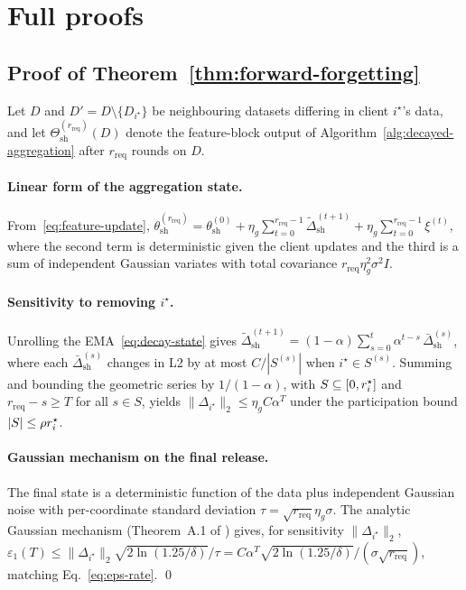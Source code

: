 \section{Full proofs}
\label{app:proofs}

\subsection{Proof of Theorem~\ref{thm:forward-forgetting}}
\label{app:proof-thm-ff}

Let $D$ and $D' = D \setminus \{D_{i^\star}\}$ be neighbouring datasets differing in
client $i^\star$'s data, and let
$\Theta^{(r_{\mathrm{req}})}_\mathrm{sh}(D)$ denote the feature-block output of
Algorithm~\ref{alg:decayed-aggregation} after $r_{\mathrm{req}}$ rounds on $D$.

\paragraph{Linear form of the aggregation state.}
From~\eqref{eq:feature-update},
$\theta^{(r_{\mathrm{req}})}_\mathrm{sh}
 = \theta^{(0)}_\mathrm{sh}
 + \eta_g \sum_{t=0}^{r_{\mathrm{req}}-1} \tilde\Delta^{(t+1)}_\mathrm{sh}
 + \eta_g \sum_{t=0}^{r_{\mathrm{req}}-1} \xi^{(t)}$,
where the second term is deterministic given the client updates and the third is a
sum of independent Gaussian variates with total covariance
$r_{\mathrm{req}} \eta_g^2 \sigma^2 I$.

\paragraph{Sensitivity to removing $i^\star$.}
Unrolling the EMA~\eqref{eq:decay-state} gives
$\tilde\Delta^{(t+1)}_\mathrm{sh} = (1-\alpha) \sum_{s=0}^{t} \alpha^{t-s}\,
\bar\Delta^{(s)}_\mathrm{sh}$, where each $\bar\Delta^{(s)}_\mathrm{sh}$ changes
in L2 by at most $C/|S^{(s)}|$ when $i^\star \in S^{(s)}$. Summing and bounding the
geometric series by $1/(1-\alpha)$, with $S \subseteq [0, r_i^{\star}]$ and
$r_\mathrm{req} - s \ge T$ for all $s \in S$, yields
$\|\Delta_{i^\star}\|_2 \le \eta_g C \alpha^T$ under the participation bound
$|S| \le \rho r_i^{\star}$.

\paragraph{Gaussian mechanism on the final release.}
The final state is a deterministic function of the data plus independent Gaussian
noise with per-coordinate standard deviation $\tau = \sqrt{r_{\mathrm{req}}} \eta_g
\sigma$. The analytic Gaussian mechanism (Theorem~A.1 of \cite{dwork2014book})
gives, for sensitivity $\|\Delta_{i^\star}\|_2$,
$\varepsilon_1(T) \le \|\Delta_{i^\star}\|_2 \sqrt{2\ln(1.25/\delta)} / \tau
= C \alpha^T \sqrt{2\ln(1.25/\delta)} / (\sigma \sqrt{r_\mathrm{req}})$, matching
Eq.~\eqref{eq:eps-rate}. \qed

